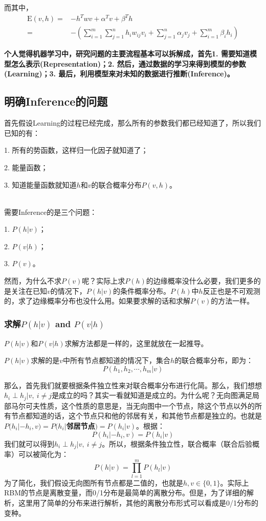 \documentclass[a4paper]{article}
\begin{document}
而其中，
\begin{equation}
\begin{split}
    \mathrm{E}(v,h) = & - h^T w v + \alpha^T v + \beta^T h \\
    = & - \left( \sum_{i=1}^m \sum_{j=1}^n h_iw_{ij}v_i + \sum_{j=1}^n \alpha_j v_j + \sum_{i=1}^m \beta_i h_i 
    \right)
\end{split}
\end{equation}

\textbf{个人觉得机器学习中，研究问题的主要流程基本可以拆解成，首先1. 需要知道模型怎么表示(Representation)；2. 然后，通过数据的学习来得到模型的参数(Learning)；3. 最后，利用模型来对未知的数据进行推断(Inference)。}

\subsection{明确Inference的问题}
\noindent 首先假设Learning的过程已经完成，那么所有的参数我们都已经知道了，所以我们已知的有：
{\color{red}

1. 所有的势函数，这样归一化因子就知道了；

2. 能量函数；

3. 知道能量函数就知道$h$和$v$的联合概率分布$P(v,h)$。
}

~\\

\noindent 需要Inference的是三个问题：

1. $P(h|v)$；

2. $P(v|h)$；

3. $P(v)$。

然而，为什么不求$P(v)$呢？实际上求$P(h)$的边缘概率没什么必要，我们更多的是关注在已知$v$的情况下，$P(h|v)$的条件概率分布。$P(h)$中$h$反正也是不可观测的，求了边缘概率分布也没什么用。如果要求解的话和求解$P(v)$的方法一样。

\subsubsection{求解$P(h|v)$ and $P(v|h)$}
$P(h|v)$和$P(v|h)$求解方法都是一样的，这里就放在一起推导。

$P(h|v)$求解的是$v$中所有节点都知道的情况下，集合$h$的联合概率分布，即为：
$$
P(h_1,h_2,\cdots,h_m|v)
$$

那么，首先我们就要根据条件独立性来对联合概率分布进行化简。那么，我们想想$h_i\perp h_j|v,\ i\neq j$是成立的吗？其实一看就知道是成立的。为什么呢？无向图满足局部马尔可夫性质，这个性质的意思是，当无向图中一个节点，除这个节点以外的所有节点都知道的话，这个节点只和他的邻居有关，和其他节点都是独立的。也就是\textbf{{\color{red}$P(h_i|-h_i,v) = P(h_i|$邻居节点$)=P(h_i|v)$}}。根据：
$$
P(h_i|-h_i,v) =P(h_i|v)
$$
我们就可以得到$h_i\perp h_j|v,\ i\neq j$。所以，根据条件独立性，联合概率（联合后验概率）可以被简化为：
\begin{equation}
    P(h|v) = \prod_{l=1}^m P(h_l|v)
\end{equation}
为了简化，我们假设无向图所有节点都是二值的，也就是$h,v\in \{0,1 \}$。实际上RBM的节点是离散变量，而0/1分布是最简单的离散分布。但是，为了详细的解析，这里用了简单的分布来进行解析，其他的离散分布形式可以看成是0/1分布的变种。
\end{document}
